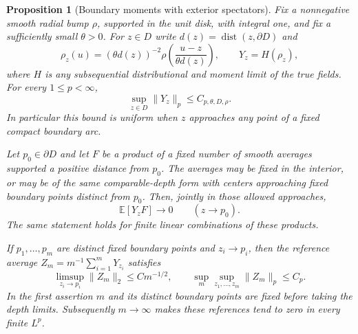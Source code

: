 \documentclass[11pt]{article}
\newtheorem{proposition}[theorem]{Proposition}
\theoremstyle{definition}
\theoremstyle{remark}
\numberwithin{equation}{section}
\begin{document}
\begin{proposition}[Boundary moments with exterior spectators]
\label{prop:boundary-moments}
Fix a nonnegative smooth radial bump $\rho$, supported in the unit
disk, with integral one, and fix a sufficiently small $\theta>0$.
For $z\in D$ write $d(z)=\operatorname{dist}(z,\partial D)$ and
\[
 \rho_z(u)=(\theta d(z))^{-2}
       \rho\!\left(\frac{u-z}{\theta d(z)}\right),\qquad
 Y_z=H(\rho_z),
\]
where $H$ is any subsequential distributional and moment limit of
the true fields.  For every $1\le p<\infty$,
\begin{equation}
 \sup_{z\in D}\|Y_z\|_p\le C_{p,\theta,D,\rho}.
 \label{boundary:uniform-depth-moments}
\end{equation}
In particular this bound is uniform when $z$ approaches any point
of a fixed compact boundary arc.

Let $p_0\in\partial D$ and let $F$ be a product of a fixed number
of smooth averages supported a positive distance from $p_0$.
The averages may be fixed in the interior, or may be of the same
comparable-depth form with centers approaching fixed boundary
points distinct from $p_0$.  Then, jointly in those allowed
approaches,
\begin{equation}
 \mathbb E[Y_zF]\longrightarrow0\qquad(z\longrightarrow p_0).
 \label{boundary:spectator-vanishing}
\end{equation}
The same statement holds for finite linear combinations of these
products.

If $p_1,\ldots,p_m$ are distinct fixed boundary points and
$z_i\to p_i$, then the reference average
$Z_m=m^{-1}\sum_{i=1}^mY_{z_i}$ satisfies
\begin{equation}
 \limsup_{z_i\to p_i}\|Z_m\|_2\le C m^{-1/2},
 \qquad \sup_m\sup_{z_1,\ldots,z_m}\|Z_m\|_p\le C_p.
 \label{boundary:reference-average}
\end{equation}
In the first assertion $m$ and its distinct boundary points are
fixed before taking the depth limits.  Subsequently $m\to\infty$
makes these references tend to zero in every finite $L^p$.
\end{proposition}
\end{document}
